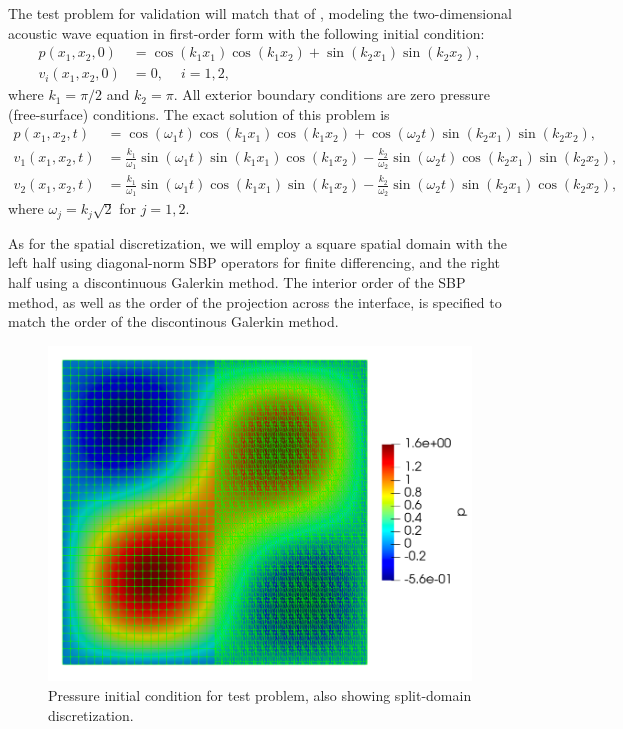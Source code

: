 The test problem for validation will match that of \cite{kozdon2016stable},
modeling the two-dimensional acoustic wave equation in first-order form with
the following initial condition:
\begin{align}
  p(x_{1},x_{2},0) &=
  \cos\left(k_{1} x_{1}\right)\cos\left(k_{1} x_{2}\right)
  +
  \sin\left(k_{2} x_{1}\right)\sin\left(k_{2} x_{2}\right),\\
  v_{i}(x_{1},x_{2},0) &= 0,~ \quad i=1,2,
\end{align}
where $k_{1} = \pi/2$ and $k_{2} = \pi$. All exterior boundary conditions are
zero pressure (free-surface) conditions. The exact solution of this problem is
\begin{align}
  p(x_{1},x_{2},t) &=
  \cos\left(\omega_{1} t\right)
  \cos\left(k_{1} x_{1}\right)\cos\left(k_{1} x_{2}\right)
  +
  \cos\left(\omega_{2} t\right)
  \sin\left(k_{2} x_{1}\right)\sin\left(k_{2} x_{2}\right),\\
  v_{1}(x_{1},x_{2},t) &=
  \frac{k_{1}}{\omega_{1}} \sin\left(\omega_{1} t\right)
  \sin\left(k_{1} x_{1}\right)\cos\left(k_{1} x_{2}\right)
  -
  \frac{k_{2}}{\omega_{2}} \sin\left(\omega_{2} t\right)
  \cos\left(k_{2} x_{1}\right)\sin\left(k_{2} x_{2}\right),\\
  v_{2}(x_{1},x_{2},t) &=
  \frac{k_{1}}{\omega_{1}} \sin\left(\omega_{1} t\right)
  \cos\left(k_{1} x_{1}\right)\sin\left(k_{1} x_{2}\right)
  -
  \frac{k_{2}}{\omega_{2}} \sin\left(\omega_{2} t\right)
  \sin\left(k_{2} x_{1}\right)\cos\left(k_{2} x_{2}\right),
\end{align}
where $\omega_{j} = k_{j}\sqrt{2}$ for $j=1,2$. 

As for the spatial discretization, we will employ a square spatial domain
with the left half using diagonal-norm SBP operators for finite differencing,
and the right half using a discontinuous Galerkin method. The interior order
of the SBP method, as well as the order of the projection across the interface,
is specified to match the order of the discontinous Galerkin method.

\begin{figure}
\centering
\includegraphics[width=0.8\linewidth,trim=4 4 4 4,clip]{figures/split_domain_wave.png}
\caption{Pressure initial condition for test problem, also showing split-domain
	 discretization.}
\label{fig:split_domain}
\end{figure}

